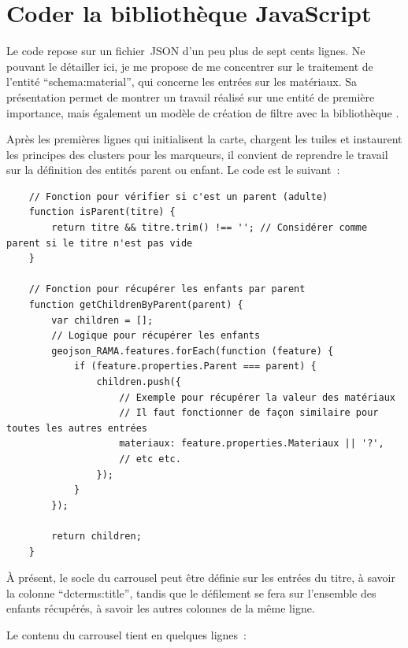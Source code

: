 \section{Coder la bibliothèque JavaScript }

Le code repose sur un fichier~JSON d’un peu plus de sept cents lignes. Ne pouvant le détailler ici, je me propose de me concentrer sur le traitement de l’entité \enquote{schema:material}, qui concerne les entrées sur les matériaux. Sa présentation permet de montrer un travail réalisé sur une entité de première importance, mais également un modèle de création de filtre avec la bibliothèque .\par
Après les premières lignes qui initialisent la carte, chargent les tuiles et instaurent les principes des clusters pour les marqueurs, il convient de reprendre le travail sur la définition des entités parent ou enfant. Le code est le suivant~:\par
\begin{lstlisting}
	// Fonction pour vérifier si c'est un parent (adulte)
	function isParent(titre) {
		return titre && titre.trim() !== ''; // Considérer comme parent si le titre n'est pas vide
	}
	
	// Fonction pour récupérer les enfants par parent
	function getChildrenByParent(parent) {
		var children = [];
		// Logique pour récupérer les enfants
		geojson_RAMA.features.forEach(function (feature) {
			if (feature.properties.Parent === parent) {
				children.push({
					// Exemple pour récupérer la valeur des matériaux
					// Il faut fonctionner de façon similaire pour toutes les autres entrées
					materiaux: feature.properties.Materiaux || '?',
					// etc etc.
				});
			}
		});
		
		return children;
	}
\end{lstlisting}\par
À présent, le socle du carrousel peut être définie sur les entrées du titre, à savoir la colonne \enquote{dcterms:title}, tandis que le défilement se fera sur l’ensemble des enfants récupérés, à savoir les autres colonnes de la même ligne.\par
Le contenu du carrousel tient en quelques lignes~:\par
